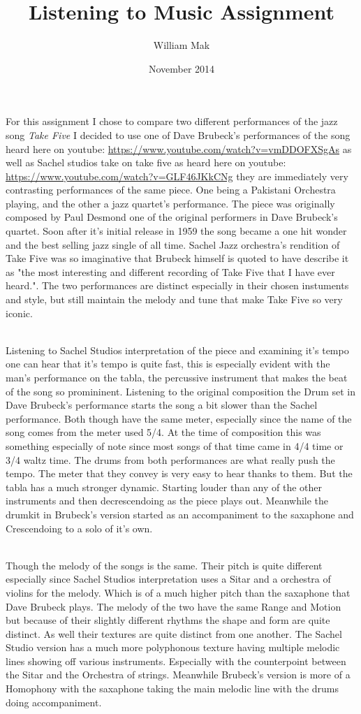 \documentclass{article}
\title{Listening to Music Assignment}
\author{William Mak}
\date{November 2014}
\begin{document}
\maketitle

For this assignment I chose to compare two different performances of the jazz 
song {\it Take Five} I decided to use one of Dave Brubeck's performances of the 
song heard here on youtube:
\url{https://www.youtube.com/watch?v=vmDDOFXSgAs}
as well as Sachel studios take on take five as heard here on youtube:
\url{https://www.youtube.com/watch?v=GLF46JKkCNg}
they are immediately very contrasting performances of the same piece. One being
a Pakistani Orchestra playing, and the other a jazz quartet's performance. The
piece was originally composed by Paul Desmond one of the original performers in
Dave Brubeck's quartet. Soon after it's initial release in 1959 the song became
a one hit wonder and the best selling jazz single of all time. Sachel Jazz
orchestra's rendition of Take Five was so imaginative that Brubeck himself is
quoted to have describe it as "the most interesting and different recording of
Take Five that I have ever heard.". The two performances are distinct especially
in their chosen instuments and style, but still maintain the melody and tune
that make Take Five so very iconic.

\\%
Listening to Sachel Studios interpretation of the piece and examining it's tempo
one can hear that it's tempo is quite fast, this is especially evident with the
man's performance on the tabla, the percussive instrument that makes the beat of
the song so promininent. Listening to the original composition the Drum set in
Dave Brubeck's performance starts the song a bit slower than the Sachel
performance. Both though have the same meter, especially since the name of the
song comes from the meter used 5/4. At the time of composition this was
something especially of note since most songs of that time came in 4/4 time or
3/4 waltz time. The drums from both performances are what really push the tempo.
The meter that they convey is very easy to hear thanks to them. But the tabla
has a much stronger dynamic. Starting louder than any of the other instruments
and then decrescendoing as the piece plays out. Meanwhile the drumkit in
Brubeck's version started as an accompaniment to the saxaphone and Crescendoing
to a solo of it's own.

\\%
Though the melody of the songs is the same. Their pitch is quite different
especially since Sachel Studios interpretation uses a Sitar and a orchestra of
violins for the melody. Which is of a much higher pitch than the saxaphone that
Dave Brubeck plays. The melody of the two have the same Range and Motion but
because of their slightly different rhythms the shape and form are quite
distinct. As well their textures are quite distinct from one another. The Sachel
Studio version has a much more polyphonous texture having multiple melodic lines
showing off various instruments. Especially with the counterpoint between the
Sitar and the Orchestra of strings. Meanwhile Brubeck's version is more of a
Homophony with the saxaphone taking the main melodic line with the drums doing
accompaniment. 
\end{document}
